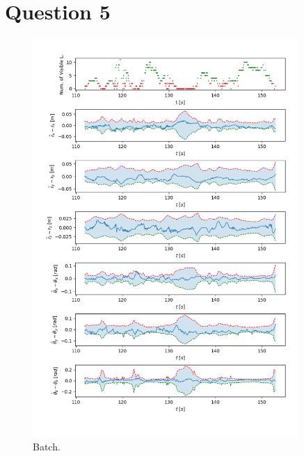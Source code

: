 \documentclass[a4paper]{article}
\begin{document}
\section*{Question 5}

\begin{figure}[H]
    \centering
    \includegraphics[width=0.9\textwidth]{code/batch.png}
    \caption{Batch.}
    \label{fig:5a}
\end{figure}
\end{document}
